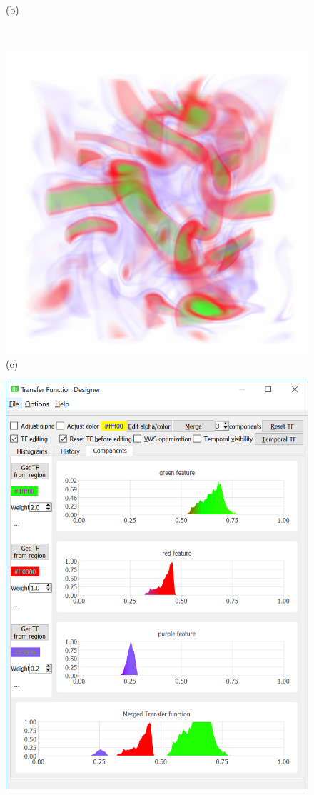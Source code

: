 \documentclass[twoside,twocolumn,10pt]{article}
\begin{document}
\begin{figure}
\begin{minipage}{.16\textwidth}
		(b)
	\end{minipage}~
	\begin{minipage}{.16\textwidth}
		\centering
		\includegraphics[width=1\linewidth]{crop/vortex_merged_segment_green_red_purple}
		(c)
	\end{minipage}
	\begin{minipage}{.16\textwidth}
		\centering
		\includegraphics[width=1\linewidth]{tf_vortex_merged_green_red_purple}

\end{minipage}
\end{figure}
\end{document}
